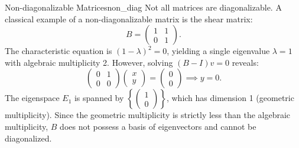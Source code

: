 \documentclass[10pt, letterpaper]{article}
\begin{document}
\begin{remark}{Non-diagonalizable Matrices}{non_diag}
    Not all matrices are diagonalizable. A classical example of a non-diagonalizable matrix is the shear matrix:
    \begin{equation*}
        B = \begin{pmatrix} 1 & 1 \\ 0 & 1 \end{pmatrix}.
    \end{equation*}
    The characteristic equation is $(1-\lambda)^2 = 0$, yielding a single eigenvalue $\lambda = 1$ with algebraic multiplicity 2. However, solving $(B - I)v = 0$ reveals:
    \begin{equation*}
        \begin{pmatrix} 0 & 1 \\ 0 & 0 \end{pmatrix}\begin{pmatrix} x \\ y \end{pmatrix} = \begin{pmatrix} 0 \\ 0 \end{pmatrix} \implies y = 0.
    \end{equation*}
    The eigenspace $E_1$ is spanned by $\left\{\begin{pmatrix} 1 \\ 0 \end{pmatrix}\right\}$, which has dimension 1 (geometric multiplicity). Since the geometric multiplicity is strictly less than the algebraic multiplicity, $B$ does not possess a basis of eigenvectors and cannot be diagonalized.
\end{remark}
\end{document}
